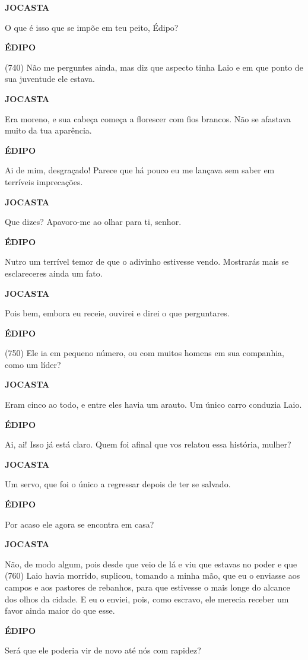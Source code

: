 \textbf{JOCASTA}

O que é isso que se impõe em teu peito, Édipo?

\textbf{ÉDIPO}

(740) Não me perguntes ainda, mas diz que aspecto tinha Laio e em que
ponto de sua juventude ele estava.

\textbf{JOCASTA}

Era moreno, e sua cabeça começa a florescer com fios brancos. Não se
afastava muito da tua aparência.

\textbf{ÉDIPO}

Ai de mim, desgraçado! Parece que há pouco eu me lançava sem saber em
terríveis imprecações.

\textbf{JOCASTA}

Que dizes? Apavoro-me ao olhar para ti, senhor.

\textbf{ÉDIPO}

Nutro um terrível temor de que o adivinho estivesse vendo. Mostrarás
mais se esclareceres ainda um fato.

\textbf{JOCASTA}

Pois bem, embora eu receie, ouvirei e direi o que perguntares.

\textbf{ÉDIPO}

(750) Ele ia em pequeno número, ou com muitos homens em sua companhia,
como um líder?

\textbf{JOCASTA}

Eram cinco ao todo, e entre eles havia um arauto. Um único carro
conduzia Laio.

\textbf{ÉDIPO}

Ai, ai! Isso já está claro. Quem foi afinal que vos relatou essa
história, mulher?

\textbf{JOCASTA}

Um servo, que foi o único a regressar depois de ter se salvado.

\textbf{ÉDIPO}

Por acaso ele agora se encontra em casa?

\textbf{JOCASTA}

Não, de modo algum, pois desde que veio de lá e viu que estavas no poder
e que (760) Laio havia morrido, suplicou, tomando a minha mão, que eu o
enviasse aos campos e aos pastores de rebanhos, para que estivesse o
mais longe do alcance dos olhos da cidade. E eu o enviei, pois, como
escravo, ele merecia receber um favor ainda maior do que esse.

\textbf{ÉDIPO}

Será que ele poderia vir de novo até nós com rapidez?


